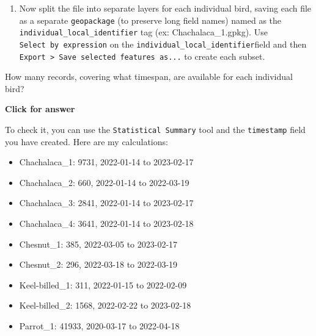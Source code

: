 \documentclass[
  letterpaper,
  DIV=11,
  numbers=noendperiod]{scrreprt}
\providecommand{\tightlist}{%
  \setlength{\itemsep}{0pt}\setlength{\parskip}{0pt}}\usepackage{longtable,booktabs,array}
\begin{document}
\begin{enumerate}
\def\labelenumi{(\arabic{enumi})}
\setcounter{enumi}{360}
\tightlist
\item
  Now split the file into separate layers for each individual bird,
  saving each file as a separate \texttt{geopackage} (to preserve long
  field names) named as the \texttt{individual\_local\_identifier} tag
  (ex: Chachalaca\_1.gpkg). Use \texttt{Select\ by\ expression} on the
  \texttt{individual\_local\_identifier}field and then
  \texttt{Export\ \textgreater{}\ Save\ selected\ features\ as...} to
  create each subset.
\end{enumerate}

\begin{tcolorbox}[enhanced jigsaw, breakable, toptitle=1mm, colback=white, left=2mm, leftrule=.75mm, titlerule=0mm, colframe=quarto-callout-important-color-frame, opacityback=0, title=\textcolor{quarto-callout-important-color}{\faExclamation}\hspace{0.5em}{Stop and Think}, toprule=.15mm, opacitybacktitle=0.6, bottomtitle=1mm, colbacktitle=quarto-callout-important-color!10!white, bottomrule=.15mm, coltitle=black, rightrule=.15mm, arc=.35mm]

How many records, covering what timespan, are available for each
individual bird?

\end{tcolorbox}

\begin{tcolorbox}[enhanced jigsaw, leftrule=.75mm, colframe=quarto-callout-important-color-frame, breakable, toprule=.15mm, bottomrule=.15mm, arc=.35mm, rightrule=.15mm, opacityback=0, colback=white, left=2mm]

\vspace{-3mm}\textbf{Click for answer}\vspace{3mm}

To check it, you can use the \texttt{Statistical\ Summary} tool and the
\texttt{timestamp} field you have created. Here are my calculations:

\begin{itemize}
\tightlist
\item
  Chachalaca\_1: 9731, 2022-01-14 to 2023-02-17
\item
  Chachalaca\_2: 660, 2022-01-14 to 2022-03-19
\item
  Chachalaca\_3: 2841, 2022-01-14 to 2023-02-17
\item
  Chachalaca\_4: 3641, 2022-01-14 to 2023-02-18
\item
  Chesnut\_1: 385, 2022-03-05 to 2023-02-17
\item
  Chesnut\_2: 296, 2022-03-18 to 2022-03-19
\item
  Keel-billed\_1: 311, 2022-01-15 to 2022-02-09
\item
  Keel-billed\_2: 1568, 2022-02-22 to 2023-02-18
\item
  Parrot\_1: 41933, 2020-03-17 to 2022-04-18
\end{itemize}

\end{tcolorbox}
\end{document}
